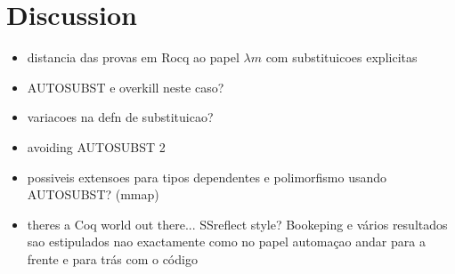 \chapter{Discussion}
\label{c:discussion}

\begin{itemize}

  
\item distancia das provas em Rocq ao papel
  \subitem $\lambda m$ com substituicoes explicitas
  
\item AUTOSUBST e overkill neste caso?
\item variacoes na defn de substituicao?
\item avoiding AUTOSUBST 2

\item possiveis extensoes para tipos dependentes e polimorfismo usando AUTOSUBST? (mmap)

\item theres a Coq world out there...
  \subitem SSreflect style? Bookeping e vários resultados sao estipulados nao exactamente como no papel
  \subitem automaçao
  \subitem andar para a frente e para trás com o código 
  
\end{itemize}


